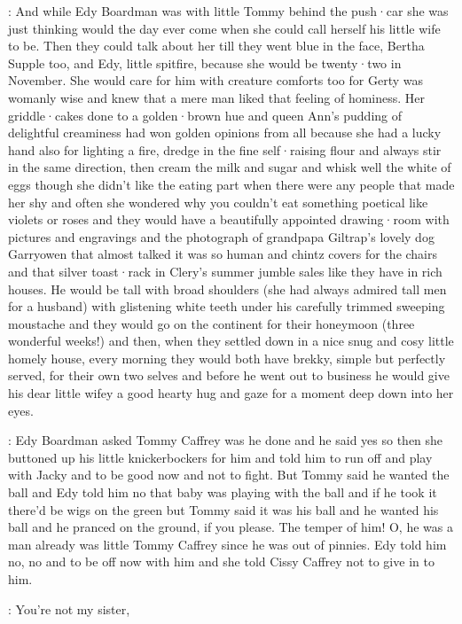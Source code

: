 :
And while Edy Boardman was with little Tommy
behind the push·car
she was just thinking
would the day ever come
when she could call herself
his little wife to be.
Then they could talk about her
till they went blue in the face,
Bertha Supple too,
and Edy,
little spitfire,
because she would be twenty·two in November.
She would care for him with creature comforts too
for Gerty was womanly wise
and knew that a mere man liked that feeling of hominess.
Her griddle·cakes done to a golden·brown hue
and queen Ann's pudding of delightful creaminess
had won golden opinions from all
because she had a lucky hand
also for lighting a fire,
dredge in the fine self·raising flour
and always stir in the same direction,
then cream the milk and sugar
and whisk well the white of eggs
though she didn't like the eating part
when there were any people
that made her shy
and often
she wondered why you couldn't eat something poetical
like violets or roses
and they would have a beautifully appointed drawing·room
with pictures and engravings
and the photograph of grandpapa Giltrap's lovely dog Garryowen
that almost talked
it was so human
and chintz covers for the chairs
and that silver toast·rack in Clery's summer jumble sales
like they have in rich houses.
He would be tall with broad shoulders
(she had always admired tall men for a husband)
with glistening white teeth under his carefully trimmed sweeping moustache
and they would go on the continent
for their honeymoon
(three wonderful weeks!)
and then,
when they settled down in a nice snug and cosy little homely house,
every morning they would both have brekky,
simple but perfectly served,
for their own two selves
and before he went out to business
he would give his dear little wifey
a good hearty hug
and gaze for a moment
deep down into her eyes.

:
Edy Boardman asked Tommy Caffrey
was he done
and he said yes
so then she buttoned up his little knickerbockers for him
and told him to run off
and play with Jacky
and to be good now
and not to fight.
But Tommy said he wanted the ball
and Edy told him
no that baby was playing with the ball
and if he took it there'd be wigs on the green
but Tommy said it was his ball
and he wanted his ball
and he pranced on the ground,
if you please.
The temper of him!
O, he was a man already
was little Tommy Caffrey
since he was out of pinnies.
Edy told him
no, no
and to be off now with him
and she told Cissy Caffrey
not to give in to him.

\tommy:
You're not my sister,

